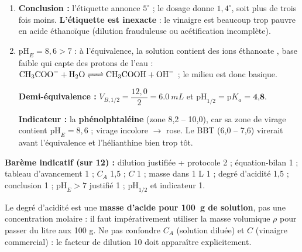 \documentclass[11pt]{article}
\begin{document}
\begin{corrige}
\begin{enumerate}
\item \textbf{Conclusion :} l'étiquette annonce $5^\circ$ ; le dosage donne $1,4^\circ$, soit plus de trois fois moins. \textbf{L'étiquette est inexacte} : le vinaigre est beaucoup trop pauvre en acide éthanoïque (dilution frauduleuse ou acétification incomplète).

\item $\mathrm{pH}_E = 8,6 > 7$ : à l'équivalence, la solution contient des ions éthanoate , base faible qui capte des protons de l'eau : $\ce{CH3COO- + H2O <=> CH3COOH + OH-}$ ; le milieu est donc basique.

\textbf{Demi-équivalence :} $V_{B,1/2} = \dfrac{12,0}{2} = \SI{6,0}{mL}$ et $\mathrm{pH}_{1/2} = \mathrm{p}K_a = \textbf{4,8}$.

\textbf{Indicateur :} la \textbf{phénolphtaléine} (zone 8,2 -- 10,0), car sa zone de virage contient $\mathrm{pH}_E = 8,6$ ; virage incolore $\to$ rose. Le BBT (6,0 -- 7,6) virerait avant l'équivalence et l'hélianthine bien trop tôt.
\end{enumerate}

\textbf{Barème indicatif (sur 12) :} dilution justifiée + protocole 2 ; équation-bilan 1 ; tableau d'avancement 1 ; $C_A$ 1,5 ; $C$ 1 ; masse dans 1 L 1 ; degré d'acidité 1,5 ; conclusion 1 ; $\mathrm{pH}_E > 7$ justifié 1 ; $\mathrm{pH}_{1/2}$ et indicateur 1.
\end{corrige}

\begin{attention}
Le degré d'acidité est une \textbf{masse d'acide pour \SI{100}{g} de solution}, pas une concentration molaire : il faut impérativement utiliser la masse volumique $\rho$ pour passer du litre aux 100 g. Ne pas confondre $C_A$ (solution diluée) et $C$ (vinaigre commercial) : le facteur de dilution 10 doit apparaître explicitement.
\end{attention}
\end{document}
